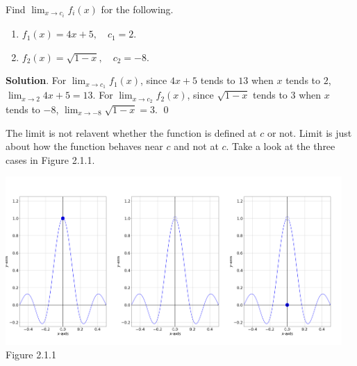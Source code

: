 \documentclass[11pt]{book}
\theoremstyle{break}
\theoremstyle{no_label}
\newcommand{\figtag}[1]{\\[-1.2em]Figure {#1}}
\numberwithin{equation}{section}
\begin{document}
\begin{example}
    Find $\displaystyle\lim_{x\to c_i}f_i(x)$ for the following.
    \begin{enumerate}
        \item $f_1(x)=4x+5, \quad c_1=2$.
        \item $f_2(x)=\sqrt{1-x}, \quad c_2=-8$.
    \end{enumerate}
\end{example}
\textbf{Solution}. For $\displaystyle\lim_{x\to c_1}f_1(x)$, since $4x+5$ tends to $13$ when $x$ tends to $2$, $\displaystyle\lim_{x\to 2}4x+5=13$. For $\displaystyle\lim_{x\to c_2}f_2(x)$, since $\sqrt{1-x}$ tends to $3$ when $x$ tends to $-8$, $\displaystyle\lim_{x\to -8}\sqrt{1-x}=3$. \qed

The limit is not relavent whether the function is defined at $c$ or not. Limit is just about how the function behaves near $c$ and not at $c$. Take a look at the three cases in Figure 2.1.1. 

\begin{center}
    \includegraphics[width=0.32\textwidth]{defined_or_not_1.png}\includegraphics[width=0.32\textwidth]{defined_or_not_2.png}\includegraphics[width=0.32\textwidth]{defined_or_not_3.png}\figtag{2.1.1}
\end{center}
\end{document}
